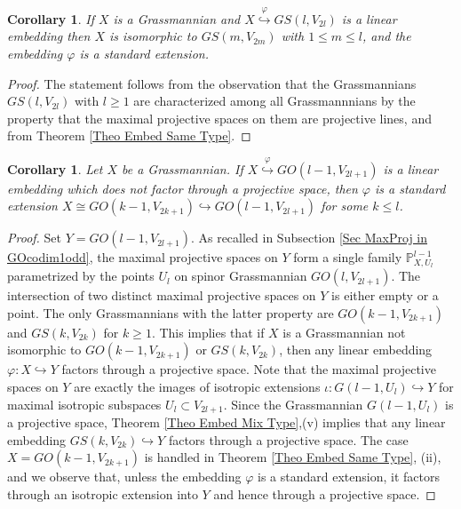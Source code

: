 \documentclass[12pt]{amsart}
\def\PP {{\mathbb P}}     %
\def\hw  {\hookrightarrow}
\newtheorem{coro}[theorem]{Corollary}
\begin{document}
\begin{coro}\label{Coro in Lagrange only Lagrange}
If $X$ is a Grassmannian and $X\stackrel{\varphi}{\hookrightarrow}GS(l,V_{2l})$ is a linear embedding then $X$ is isomorphic to $GS(m,V_{2m})$ with $1\leq m\leq l$, and the embedding $\varphi$ is a standard extension.
\end{coro}

\begin{proof}
The statement follows from the observation that the Grassmannians $GS(l,V_{2l})$ with $l\geq 1$ are characterized among all Grassmannnians by the property that the maximal projective spaces on them are projective lines, and from Theorem \ref{Theo Embed Same Type}.
\end{proof}

\begin{coro}\label{Coro Embed in GOcodim1odd}
Let $X$ be a Grassmannian. If $X\stackrel{\varphi}{\hookrightarrow} GO(l-1,V_{2l+1})$ is a linear embedding which does not factor through a projective space, then $\varphi$ is a standard extension $X\cong GO(k-1,V_{2k+1})\hookrightarrow GO(l-1,V_{2l+1})$ for some $k\leq l$.
\end{coro}

\begin{proof}
Set $Y=GO(l-1,V_{2l+1})$. As recalled in Subsection \ref{Sec MaxProj in GOcodim1odd}, the maximal projective spaces on $Y$ form a single family $\PP^{l-1}_{X,U_l}$ parametrized by the points $U_l$ on spinor Grassmannian $GO(l,V_{2l+1})$. The intersection of two distinct maximal projective spaces on $Y$ is either empty or a point. The only Grassmannians with the latter property are $GO(k-1,V_{2k+1})$ and $GS(k,V_{2k})$ for $k\geq 1$. This implies that if $X$ is a Grassmannian not isomorphic to $GO(k-1,V_{2k+1})$ or $GS(k,V_{2k})$, then any linear embedding $\varphi:X\hw Y$ factors through a projective space. Note that the maximal projective spaces on $Y$ are exactly the images of isotropic extensions $\iota:G(l-1,U_l)\hw Y$ for maximal isotropic subspaces $U_l\subset V_{2l+1}$. Since the Grassmannian $G(l-1,U_l)$ is a projective space, Theorem \ref{Theo Embed Mix Type},(v) implies that any linear embedding $GS(k,V_{2k})\hw Y$ factors through a projective space. The case $X= GO(k-1,V_{2k+1})$ is handled in Theorem \ref{Theo Embed Same Type}, (ii), and we observe that, unless the embedding $\varphi$ is a standard extension, it factors through an isotropic extension into $Y$ and hence through a projective space.
\end{proof}
\end{document}

